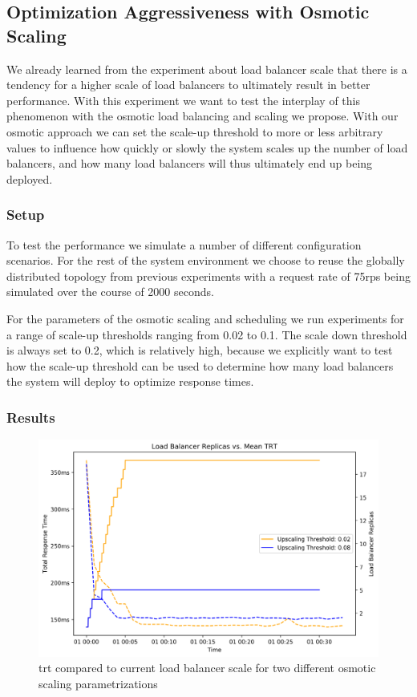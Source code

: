 \subsection{Optimization Aggressiveness with Osmotic Scaling}
We already learned from the experiment about load balancer scale that there is a tendency for a higher scale of load balancers to ultimately result in better performance.
With this experiment we want to test the interplay of this phenomenon with the osmotic load balancing and scaling we propose. With our osmotic approach we can set the scale-up threshold to more or less arbitrary values to influence how quickly or slowly the system scales up the number of load balancers, and how many load balancers will thus ultimately end up being deployed.

\subsubsection{Setup}
To test the performance we simulate a number of different configuration scenarios. For the rest of the system environment we choose to reuse the globally distributed topology from previous experiments with a request rate of 75\gls{rps} being simulated over the course of 2000 seconds.

For the parameters of the osmotic scaling and scheduling we run experiments for a range of scale-up thresholds ranging from 0.02 to 0.1.
The scale down threshold is always set to 0.2, which is relatively high, because we explicitly want to test how the scale-up threshold can be used to determine how many load balancers the system will deploy to optimize response times.

\subsubsection{Results}



\begin{figure}
    \centering
    \includegraphics[width=12cm]{graphics/graphs/osmotic_optim_thres_vs_trt.png}
    \caption{\gls{trt} compared to current load balancer scale for two different osmotic scaling parametrizations}
    \label{fig:osmotic_trt_vs_replica_scale}
\end{figure}

